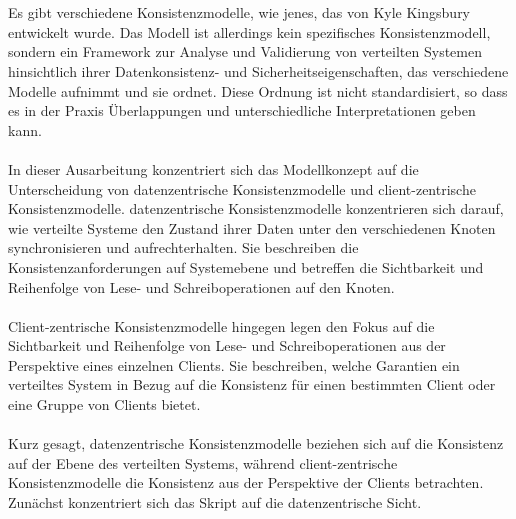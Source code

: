 \documentclass[../vs-script-first-v01.tex]{subfiles}
\begin{document}
\\\\
Es gibt verschiedene Konsistenzmodelle, wie jenes, das von Kyle Kingsbury entwickelt wurde. Das Modell ist allerdings  kein spezifisches Konsistenzmodell, sondern ein Framework zur Analyse und Validierung von verteilten Systemen hinsichtlich ihrer Datenkonsistenz- und Sicherheitseigenschaften, das verschiedene Modelle aufnimmt und sie ordnet. Diese Ordnung ist nicht standardisiert, so dass es in der Praxis Überlappungen und unterschiedliche Interpretationen geben kann. 
\\\\
In dieser Ausarbeitung konzentriert sich das Modellkonzept auf die Unterscheidung von datenzentrische Konsistenzmodelle und client-zentrische Konsistenzmodelle. datenzentrische Konsistenzmodelle konzentrieren sich darauf, wie verteilte Systeme den Zustand ihrer Daten unter den verschiedenen Knoten synchronisieren und aufrechterhalten. Sie beschreiben die Konsistenzanforderungen auf Systemebene und betreffen die Sichtbarkeit und Reihenfolge von Lese- und Schreiboperationen auf den Knoten.
\\\\
Client-zentrische Konsistenzmodelle hingegen legen den Fokus auf die Sichtbarkeit und Reihenfolge von Lese- und Schreiboperationen aus der Perspektive eines einzelnen Clients. Sie beschreiben, welche Garantien ein verteiltes System in Bezug auf die Konsistenz für einen bestimmten Client oder eine Gruppe von Clients bietet.
\\\\
Kurz gesagt, datenzentrische Konsistenzmodelle beziehen sich auf die Konsistenz auf der Ebene des verteilten Systems, während client-zentrische Konsistenzmodelle die Konsistenz aus der Perspektive der Clients betrachten. Zunächst konzentriert sich das Skript auf die datenzentrische Sicht. 
\end{document}
